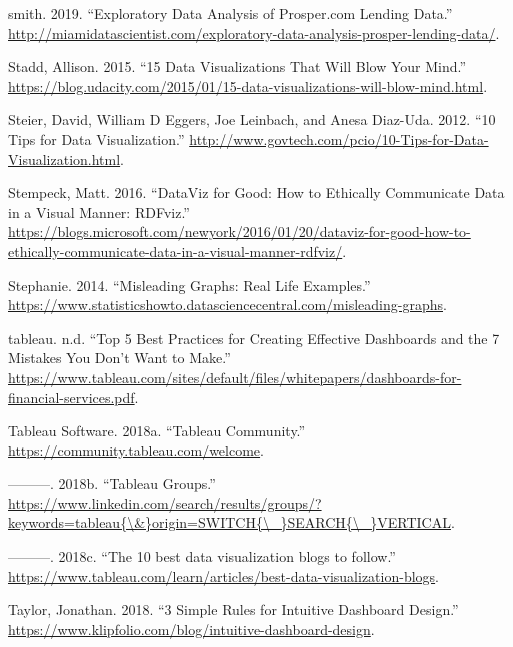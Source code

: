 \documentclass[]{book}
\begin{document}
\hypertarget{ref-david_2019}{}
smith. 2019. ``Exploratory Data Analysis of Prosper.com Lending Data.''
\url{http://miamidatascientist.com/exploratory-data-analysis-prosper-lending-data/}.

\hypertarget{ref-15_mindblowing}{}
Stadd, Allison. 2015. ``15 Data Visualizations That Will Blow Your
Mind.''
\url{https://blog.udacity.com/2015/01/15-data-visualizations-will-blow-mind.html}.

\hypertarget{ref-Steier}{}
Steier, David, William D Eggers, Joe Leinbach, and Anesa Diaz-Uda. 2012.
``10 Tips for Data Visualization.''
\url{http://www.govtech.com/pcio/10-Tips-for-Data-Visualization.html}.

\hypertarget{ref-dataviz_for_good}{}
Stempeck, Matt. 2016. ``DataViz for Good: How to Ethically Communicate
Data in a Visual Manner: RDFviz.''
\url{https://blogs.microsoft.com/newyork/2016/01/20/dataviz-for-good-how-to-ethically-communicate-data-in-a-visual-manner-rdfviz/}.

\hypertarget{ref-missing_baseline}{}
Stephanie. 2014. ``Misleading Graphs: Real Life Examples.''
\url{https://www.statisticshowto.datasciencecentral.com/misleading-graphs}.

\hypertarget{ref-dashboard_practices}{}
tableau. n.d. ``Top 5 Best Practices for Creating Effective Dashboards
and the 7 Mistakes You Don't Want to Make.''
\href{\%20https://www.tableau.com/sites/default/files/whitepapers/dashboards-for-financial-services.pdf\%20}{https://www.tableau.com/sites/default/files/whitepapers/dashboards-for-financial-services.pdf}.

\hypertarget{ref-Tableau_Community}{}
Tableau Software. 2018a. ``Tableau Community.''
\url{https://community.tableau.com/welcome}.

\hypertarget{ref-LinkedIn_Groups}{}
---------. 2018b. ``Tableau Groups.''
\href{https://www.linkedin.com/search/results/groups/?keywords=tableau\%7B/\&\%7Dorigin=SWITCH\%7B/_\%7DSEARCH\%7B/_\%7DVERTICAL}{https://www.linkedin.com/search/results/groups/?keywords=tableau\{\textbackslash{}\&\}origin=SWITCH\{\textbackslash{}\_\}SEARCH\{\textbackslash{}\_\}VERTICAL}.

\hypertarget{ref-Top_10_Blogs}{}
---------. 2018c. ``The 10 best data visualization blogs to follow.''
\url{https://www.tableau.com/learn/articles/best-data-visualization-blogs}.

\hypertarget{ref-intuitive_dash}{}
Taylor, Jonathan. 2018. ``3 Simple Rules for Intuitive Dashboard
Design.''
\url{https://www.klipfolio.com/blog/intuitive-dashboard-design}.
\end{document}

